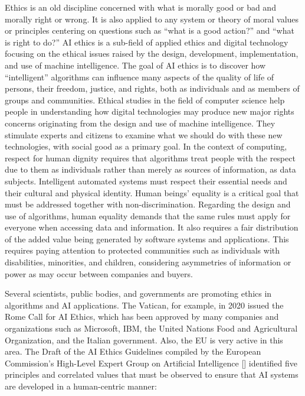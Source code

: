 Ethics is an old discipline concerned with what is morally good or bad and morally right or wrong. It is also applied to any system or theory of moral values or principles centering on questions such as ``what is a good action?'' and ``what is right to do?'' AI ethics is a sub-field of applied ethics and digital technology focusing on the ethical issues raised by the design, development, implementation, and use of machine intelligence. The goal of AI ethics is to discover how ``intelligent'' algorithms can influence many aspects of the quality of life of persons, their freedom, justice, and rights, both as individuals and as members of groups and communities. Ethical studies in the field of computer science help people in understanding how digital technologies may produce new major rights concerns originating from the design and use of machine intelligence. They stimulate experts and citizens to examine what we should do with these new technologies, with social good as a primary goal. In the context of computing, respect for human dignity requires that algorithms treat people with the respect due to them as individuals rather than merely as sources of information, as data subjects. Intelligent automated systems must respect their essential needs and their cultural and physical identity. Human beings' equality is a critical goal that must be addressed together with non-discrimination. Regarding the design and use of algorithms, human equality demands that the same rules must apply for everyone when accessing data and information. It also requires a fair distribution of the added value being generated by software systems and applications. This requires paying attention to protected communities such as individuals with disabilities, minorities, and \hbox{children,} \hbox{considering} asymmetries of information or power as may occur between companies and buyers.

Several scientists, public bodies, and governments are promoting ethics in algorithms and AI applications. The Vatican, for example, in 2020 issued the Rome Call for AI Ethics, which has been approved by many companies and organizations such as Microsoft, IBM, the United Nations Food and Agricultural Organization, and the Italian government. Also, the EU is very active in this area. The Draft of the AI Ethics Guidelines compiled by the European Commission's High-Level Expert Group on Artificial Intelligence [\citealt{chap:7:High-LevelExpertGrouponArtificialIntelligence:2019}] identified five principles and correlated values that must be observed to ensure that AI systems are developed in a human-centric manner:


